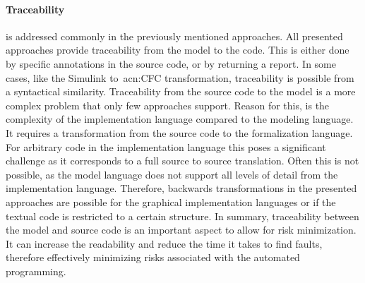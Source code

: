 \paragraph{Traceability} is addressed commonly in the previously mentioned approaches.
All presented approaches provide traceability from the model to the code.
This is either done by specific annotations in the source code, or by returning a report.
In some cases, like the Simulink to~\acrshort{acn:CFC} transformation, traceability is possible from a syntactical similarity.
Traceability from the source code to the model is a more complex problem that only few approaches support.
Reason for this, is the complexity of the implementation language compared to the modeling language.
It requires a transformation from the source code to the formalization language.
For arbitrary code in the implementation language this poses a significant challenge as it corresponds to a full source to source translation.
Often this is not possible, as the model language does not support all levels of detail from the implementation language.
Therefore, backwards transformations in the presented approaches are possible for the graphical implementation languages or if the textual code is restricted to a certain structure.
In summary, traceability between the model and source code is an important aspect to allow for risk minimization.
It can increase the readability and reduce the time it takes to find faults, therefore effectively minimizing risks associated with the automated programming.

